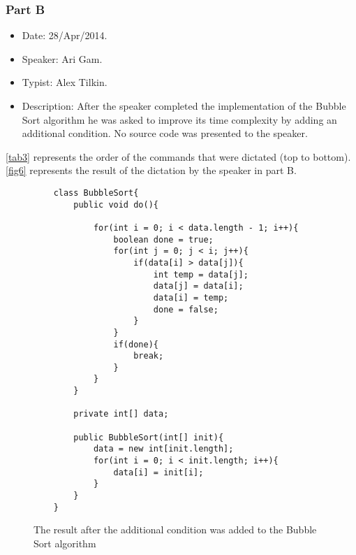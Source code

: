 \subsubsection{Part B}
\begin{itemize}
	\item Date: 28/Apr/2014.
	\item Speaker: Ari Gam.
	\item Typist: Alex Tilkin.
	\item Description: After the speaker completed the implementation of the Bubble Sort algorithm he was asked to improve its time complexity by adding an additional condition. No source code was presented to the speaker.
\end{itemize}
\autoref{tab3} represents the order of the commands that were dictated (top to bottom). \autoref{fig6} represents the result of the dictation by the speaker in part B.
\begin{figure}[H]
	\begin{lstlisting}
	class BubbleSort{
		public void do(){
			
			for(int i = 0; i < data.length - 1; i++){
				boolean done = true;
				for(int j = 0; j < i; j++){
					if(data[i] > data[j]){
						int temp = data[j];
						data[j] = data[i];
						data[i] = temp;
						done = false;
					}
				}
				if(done){
					break;
				}
			}
		}
		
		private int[] data;
		
		public BubbleSort(int[] init){
			data = new int[init.length];
			for(int i = 0; i < init.length; i++){
				data[i] = init[i];
			}
		}
	}
	\end{lstlisting}
	\caption{The result after the additional condition was  added to the Bubble Sort algorithm}
	\label{fig6}
\end{figure}
